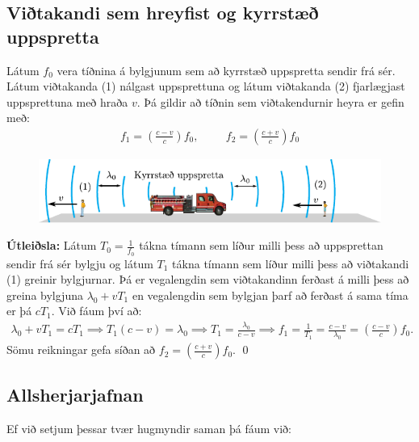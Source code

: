 \ifdefined \wholebook \else\documentclass[oneside]{book}\usepackage{EdlBook}\graphicspath{{figures/}}
\begin{document}
\subsection*{Viðtakandi sem hreyfist og kyrrstæð uppspretta}

\begin{tcolorbox}
\begin{theorem}
Látum $f_0$ vera tíðnina á bylgjunum sem að kyrrstæð uppspretta sendir frá sér. Látum viðtakanda (1) nálgast uppsprettuna og látum viðtakanda (2) fjarlægjast uppsprettuna með hraða $v$. Þá gildir að tíðnin sem viðtakendurnir heyra er gefin með:
\begin{align*}
    f_1 = \left( \frac{c-v}{c} \right)f_0, \hspace{1cm} f_2 = \left( \frac{c+v}{c} \right)f_0
\end{align*}
\begin{figure}[H]
    \centering
    \vspace{-0.5cm}
    \includegraphics[scale = 0.8]{figures/doppler-brunabill-kyrr.pdf}
\end{figure}
\end{theorem}
\end{tcolorbox}

\textbf{Útleiðsla:} Látum $T_0 = \frac{1}{f_0}$ tákna tímann sem líður milli þess að uppsprettan sendir frá sér bylgju og látum $T_1$ tákna tímann sem líður milli þess að viðtakandi (1) greinir bylgjurnar. Þá er vegalengdin sem viðtakandinn ferðast á milli þess að greina bylgjuna $\lambda_0 + vT_1$ en vegalengdin sem bylgjan þarf að ferðast á sama tíma er þá $cT_1$. Við fáum því að:
\begin{align*}
    \lambda_0 + vT_1 = cT_1 \implies T_1 (c-v) = \lambda_0 \implies T_1 = \frac{\lambda_0}{c-v} \implies f_1 = \frac{1}{T_1} = \frac{c-v}{\lambda_0} = \left(\frac{c-v}{c}\right) f_0.
\end{align*}
Sömu reikningar gefa síðan að $f_2 = \left(\frac{c+v}{c} \right)f_0$.
\qed

\subsection*{Allsherjarjafnan}

Ef við setjum þessar tvær hugmyndir saman þá fáum við:
\end{document}

